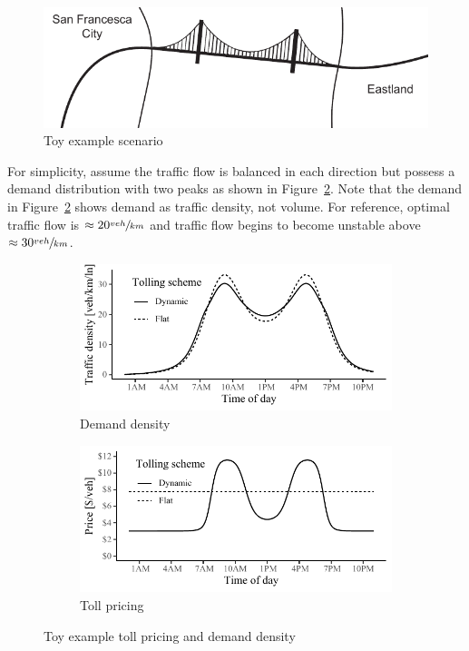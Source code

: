 \documentclass[10pt, letter, twocolumn]{article} %
\begin{document}
 \begin{figure}[h]
 	\centering
 	\includegraphics[width=\linewidth]{figures/silvergate}
 	\caption{Toy example scenario}
 	\label{fig:toymap}
 \end{figure}
 
 \noindent For simplicity, assume the traffic flow is balanced in each direction but possess a demand distribution with two peaks as shown in Figure~\ref{fig:toydem}. Note that the demand in Figure~\ref{fig:toydem} shows demand as traffic density, not volume. For reference, optimal traffic flow is $\approx 20 \sfrac{veh}{km}$ and traffic flow begins to become unstable above $\approx 30 \sfrac{veh}{km}$.
   
 \begin{figure}[h]
     \begin{subfigure}[h]{\linewidth}
     	\centering
     	\includegraphics[width=\textwidth]{figures/toydemand}
     	\caption{Demand density}
     	\label{fig:toydem}
     \end{subfigure}
     \begin{subfigure}[h]{\linewidth}
     	\centering
     	\includegraphics[width=\textwidth]{figures/toytoll}
     	\caption{Toll pricing}
     	\label{fig:toytoll}
     \end{subfigure}
     \caption{Toy example toll pricing and demand density}
     \label{fig:toymodel}
 \end{figure}
 
\end{document}
